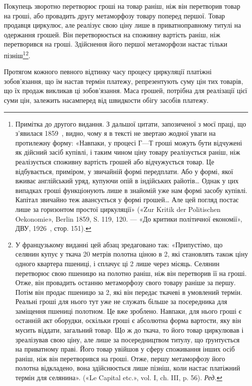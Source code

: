 Покупець зворотно перетворює гроші на товар раніш, ніж
він перетворив товар на гроші, або провадить другу метаморфозу
товару поперед першої. Товар продавця циркулює, але реалізує
свою ціну лише в приватноправному титулі на одержання
грошей. Він перетворюється на споживну вартість раніш, ніж
перетворився на гроші. Здійснення його першої метаморфози
настає тільки пізніш\footnote{Примітка до другого видання. З дальшої цитати, запозиченої з
моєї праці, що з’явилася 1859~, видно, чому я в тексті не звертаю жодної
уваги на протилежну форму: «Навпаки, у процесі $Г — Т$ гроші можуть
бути відчужені як дійсний засіб купівлі, і таким чином ціну товару реалізується
раніш, ніж реалізується споживну вартість грошей або відчужується
товар. Це відбувається, приміром, у звичайній формі передплати.
Або у формі, якої вживає англійський уряд, купуючи опій в індійських
райотів\dots{} Однак у цих випадках гроші функціонують лише в знайомій
уже нам формі засобу купівлі. Капітал звичайно теж авансується у формі
грошей\dots{} Але цей погляд постає лише за горизонтом простої циркуляції»
(«Zur Kritik der Politischen Oekonomie», Berlin 1859, S. 119, 120. — «До
критики політичної економії», ДВУ, 1926~, стор. 151).}\footnote*{У французькому виданні цей абзац зредаговано так: «Припустімо,
що селянин купує у ткача 20 метрів полотна ціною в 2,
які становлять також ціну одного квартера пшениці, і сплачує ці 2 лише через місяць. Селянин перетворює свою пшеницю на
полотно раніш, ніж він перетворив її на гроші. Отже, він провадить останню
метаморфозу свого товару раніше за першу. Потім він продає
пшеницю за 2, які він передає ткачеві в умовлений термін.
Реальні гроші для нього тут уже не служать більше за посередника
для заміщення пшениці полотном. Це вже зроблено. Навпаки, для нього
гроші є останній акт оборудки, оскільки гроші є абсолютна форма вартости,
яку він мусить віддати, загальний товар. Що ж до ткача, то його
товар циркулював і зреалізував свою ціну, але лише за посередництвом
титулу, що ґрунтується на приватному праві. Його товар увійшов у сферу
споживання інших осіб раніш, ніж він перетворився на гроші. Отже,
першу метаморфозу його полотна відкладено, вона здійснюється лише
пізніш, коли настає платіжний термін для селянина». («Le Capital etc.», vol.
I, ch. III, p. 56). \emph{Ред.}}.

Протягом кожного певного відтинку часу процесу циркуляції
платіжні зобов’язання, що їм настав термін платежу, репрезентують
суму цін тих товарів, що їх продаж викликав ці зобов’язання.
Маса грошей, потрібна для реалізації цієї суми цін,
залежить насамперед від швидкости обігу засобів платежу.
\parbreak{}  %
